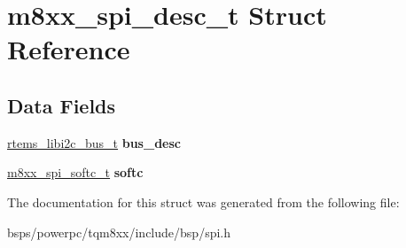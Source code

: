 \hypertarget{structm8xx__spi__desc__t}{}\section{m8xx\+\_\+spi\+\_\+desc\+\_\+t Struct Reference}
\label{structm8xx__spi__desc__t}
\subsection*{Data Fields}
\begin{DoxyCompactItemize}
\item 
\mbox{\label{structm8xx__spi__desc__t_a2f8da54a9ba96017b1ccd1549b7e2f68}} 
\mbox{\hyperlink{structrtems__libi2c__bus__t__}{rtems\+\_\+libi2c\+\_\+bus\+\_\+t}} {\bfseries bus\+\_\+desc}
\item 
\mbox{\label{structm8xx__spi__desc__t_ac399abbb6af1285d4aeb44b1dfcf8f07}} 
\mbox{\hyperlink{structm8xx__spi__softc}{m8xx\+\_\+spi\+\_\+softc\+\_\+t}} {\bfseries softc}
\end{DoxyCompactItemize}


The documentation for this struct was generated from the following file\+:\begin{DoxyCompactItemize}
\item 
bsps/powerpc/tqm8xx/include/bsp/spi.\+h\end{DoxyCompactItemize}
